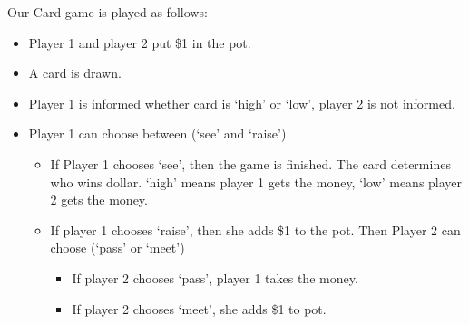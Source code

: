 \begin{illustration} Our Card game is played as follows:
    \begin{itemize}
        \item Player 1 and player 2 put \$1 in the pot.
        \item A card is drawn.
        \item Player 1 is informed whether card is `high' or `low', player 2 is not informed.
        \item Player 1 can choose between (`see' and `raise')
              \begin{itemize}
                  \item If Player 1 chooses `see', then the game is finished. The card determines who wins dollar. `high' means player 1 gets the money, `low' means player 2 gets the money.
                  \item If player 1 chooses `raise', then she adds \$1 to the pot. Then Player 2 can choose (`pass' or `meet')
                        \begin{itemize}
                            \item If player 2 chooses `pass', player 1 takes the money.
                            \item If player 2 chooses `meet', she adds \$1 to pot.
                        \end{itemize}
              \end{itemize}
    \end{itemize}
\end{illustration}


